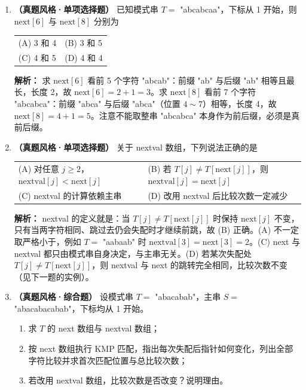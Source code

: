 \begin{enumerate}[resume]

\item \textbf{（真题风格·单项选择题）} 已知模式串 $T=$ "abcabcaa"，下标从 1 开始，则 $\mathrm{next}[6]$ 与 $\mathrm{next}[8]$ 分别为
\begin{center}
\begin{tabular}{ll}
(A) 3 和 4 & (B) 3 和 5 \\[6pt]
(C) 4 和 5 & (D) 4 和 4
\end{tabular}
\end{center}

\ifshowsolutions\par\noindent\textbf{解析：} 求 $\mathrm{next}[6]$ 看前 5 个字符 "abcab"：前缀 "ab" 与后缀 "ab" 相等且最长，长度 2，故 $\mathrm{next}[6]=2+1=3$。求 $\mathrm{next}[8]$ 看前 7 个字符 "abcabca"：前缀 "abca" 与后缀 "abca"（位置 $4\sim 7$）相等，长度 4，故 $\mathrm{next}[8]=4+1=5$。注意不能取整串 "abcabca" 本身作为前后缀，必须是真前后缀。\else \answerarea \fi

\item \textbf{（真题风格·单项选择题）} 关于 nextval 数组，下列说法正确的是
\begin{center}
\begin{tabular}{ll}
(A) 对任意 $j\geqslant 2$，$\mathrm{nextval}[j]<\mathrm{next}[j]$ & (B) 若 $T[j]\neq T[\mathrm{next}[j]]$，则 $\mathrm{nextval}[j]=\mathrm{next}[j]$ \\[6pt]
(C) nextval 的计算依赖主串 & (D) 改用 nextval 后比较次数一定减少
\end{tabular}
\end{center}

\ifshowsolutions\par\noindent\textbf{解析：} nextval 的定义就是：当 $T[j]\neq T[\mathrm{next}[j]]$ 时保持 $\mathrm{next}[j]$ 不变，只有当两字符相同、跳过去仍会失配时才继续前跳，故 (B) 正确。(A) 不一定取严格小于，例如 $T=$ "aabaab" 时 $\mathrm{nextval}[3]=\mathrm{next}[3]=2$。(C) next 与 nextval 都只由模式串自身决定，与主串无关。(D) 若某次失配处 $T[j]\neq T[\mathrm{next}[j]]$，则 nextval 与 next 的跳转完全相同，比较次数不变（见下一题的实例）。\else \answerarea \fi

\item \textbf{（真题风格·综合题）} 设模式串 $T=$ "abacabab"，主串 $S=$ "abacabacabab"，下标均从 1 开始。
\begin{enumerate}
\item[(1)] 求 $T$ 的 next 数组与 nextval 数组；
\item[(2)] 按 next 数组执行 KMP 匹配，指出每次失配后指针如何变化，列出全部字符比较并求首次匹配位置与总比较次数；
\item[(3)] 若改用 nextval 数组，比较次数是否改变？说明理由。
\end{enumerate}


\end{enumerate}

